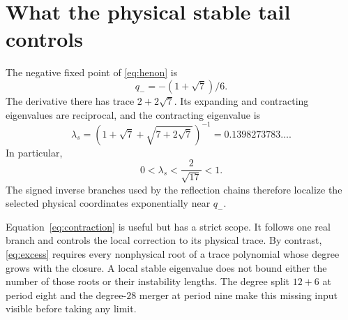 \section{What the physical stable tail controls}

The negative fixed point of \eqref{eq:henon} is
\begin{equation}
q_-=-(1+\sqrt7)/6.
\end{equation}
The derivative there has trace \(2+2\sqrt7\).  Its expanding and contracting
eigenvalues are reciprocal, and the contracting eigenvalue is
\begin{equation}
\lambda_s=
\left(1+\sqrt7+\sqrt{7+2\sqrt7}\right)^{-1}
=0.1398273783\ldots.
\end{equation}
In particular,
\begin{equation}
0<\lambda_s<\frac{2}{\sqrt{17}}<1.
\label{eq:contraction}
\end{equation}
The signed inverse branches used by the reflection chains therefore localize
the selected physical coordinates exponentially near \(q_-\).

Equation~\eqref{eq:contraction} is useful but has a strict scope.  It follows
one real branch and controls the local correction to its physical trace.  By
contrast, \eqref{eq:excess} requires every nonphysical root of a trace
polynomial whose degree grows with the closure.  A local stable eigenvalue
does not bound either the number of those roots or their instability lengths.
The degree split $12+6$ at period eight and the degree-$28$ merger at period
nine make this missing input visible before taking any limit.
